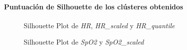 \paragraph{Puntuación de Silhouette de los clústeres obtenidos}

\begin{figure}[H]
    \centering
    \caption{Silhouette Plot de \textit{HR}, \textit{HR\_scaled} y \textit{HR\_quantile}}\label{fig:raw_data_si_fc}
\end{figure}

\begin{figure}[ht]
    \centering
    \hfill
    \caption{Silhouette Plot de \textit{SpO2} y \textit{SpO2\_scaled}}\label{fig:raw_data_si_spo2}
\end{figure}


